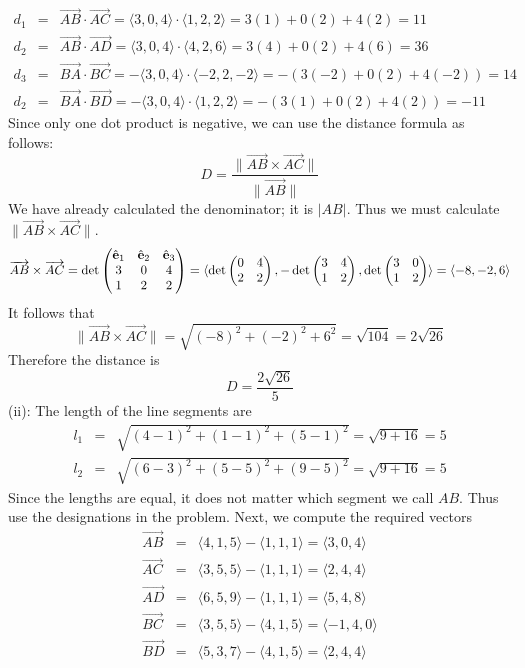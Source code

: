 \documentclass[12pt]{amsbook}
\newcommand{\la}{\langle}
\newcommand{\ra}{\rangle}
\begin{document}
\begin{eqnarray*}
d_1&=&\overrightarrow{AB}\cdot\overrightarrow{AC}=\la 3,0,4 \ra \cdot \la 1,2,2 \ra = 3(1)+0(2)+4(2)=11 \\
d_2&=&\overrightarrow{AB}\cdot\overrightarrow{AD}=\la 3,0,4 \ra \cdot \la 4,2,6 \ra = 3(4)+0(2)+4(6)=36 \\
d_3&=&\overrightarrow{BA}\cdot\overrightarrow{BC}=-\la 3,0,4 \ra \cdot \la -2,2,-2 \ra = -(3(-2)+0(2)+4(-2))=14 \\
d_2&=&\overrightarrow{BA}\cdot\overrightarrow{BD}=-\la 3,0,4 \ra \cdot \la 1,2,2 \ra = -(3(1)+0(2)+4(2))=-11
\end{eqnarray*}
Since only one dot product is negative, we can use the distance formula as follows:
$$D=\frac{\|\overrightarrow{AB}\times\overrightarrow{AC}\|}{\|\overrightarrow{AB}\|}$$
We have already calculated the denominator; it is $|AB|$. Thus we must calculate $\|\overrightarrow{AB}\times\overrightarrow{AC}\|$.
$$\overrightarrow{AB}\times\overrightarrow{AC}=\det
\begin{pmatrix}
\hat{\bf e}_1 & \hat{\bf e}_2 & \hat{\bf e}_3\cr 3&0&4\cr 1&2&2 \end{pmatrix}=\la \det\begin{pmatrix}0&4\cr 2&2  \end{pmatrix}, -\det\begin{pmatrix}3&4\cr 1&2  \end{pmatrix}, \det\begin{pmatrix}3&0\cr 1&2 \end{pmatrix} \ra = \la -8,-2,6 \ra$$
It follows that
$$\|\overrightarrow{AB}\times\overrightarrow{AC}\|=\sqrt{(-8)^2+(-2)^2+6^2}=\sqrt{104}=2\sqrt{26}$$
Therefore the distance is
$$D=\frac{2\sqrt{26}}{5}$$
(ii): The length of the line segments are 
\begin{eqnarray*}
l_1&=&\sqrt{(4-1)^2+(1-1)^2+(5-1)^2}=\sqrt{9+16}=5\\
l_2&=&\sqrt{(6-3)^2+(5-5)^2+(9-5)^2}=\sqrt{9+16}=5
\end{eqnarray*}
Since the lengths are equal, it does not matter which segment we call $AB$. Thus use the designations in the problem. Next, we compute the required vectors
\begin{eqnarray*}
\overrightarrow{AB}&=&\la 4,1,5 \ra - \la 1,1,1 \ra =\la 3,0,4 \ra \\
\overrightarrow{AC}&=&\la 3,5,5 \ra - \la 1,1,1 \ra =\la 2,4,4 \ra \\
\overrightarrow{AD}&=&\la 6,5,9 \ra - \la 1,1,1 \ra =\la 5,4,8 \ra \\
\overrightarrow{BC}&=&\la 3,5,5 \ra - \la 4,1,5 \ra =\la -1,4,0 \ra \\
\overrightarrow{BD}&=&\la 5,3,7 \ra - \la 4,1,5 \ra =\la 2,4,4 \ra 
\end{eqnarray*}
\end{document}
